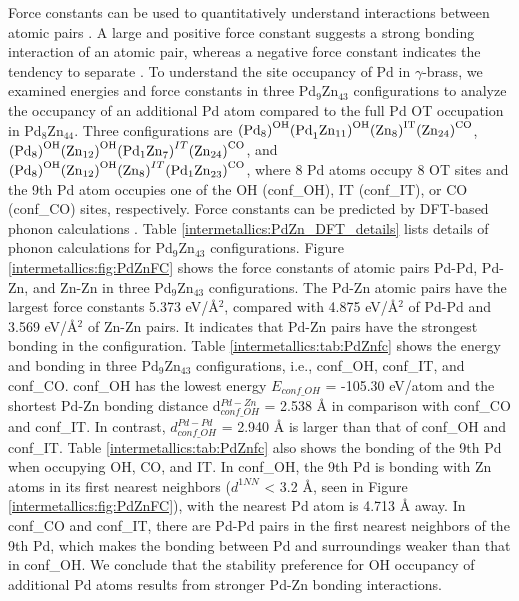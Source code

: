 Force constants can be used to quantitatively understand interactions between atomic pairs \cite{shang2009first}. A large and positive force constant suggests a strong bonding interaction of an atomic pair, whereas a negative force constant indicates the tendency to separate \cite{yu2019synthesis}. To understand the site occupancy of Pd in $\gamma$-brass, we examined energies and force constants in three Pd$_9$Zn$_{43}$ configurations to analyze the occupancy of an additional Pd atom compared to the full Pd OT occupation in Pd$_8$Zn$_{44}$. Three configurations are $({{\rm Pd}_8)}^{\rm OH}{{(\rm Pd}_1{\rm Zn}_{11})}^{\rm OH}({{\rm Zn}_8)}^{\rm IT}({{\rm Zn}_{24})}^{\rm CO}$, \\$({{\rm Pd}_8)}^{\rm OH}{({\rm Zn}_{12})}^{\rm OH}({{{\rm Pd}_1\rm Zn}_7)}^{IT}({{\rm Zn}_{24})}^{\rm CO}$, and $({{\rm Pd}_8)}^{\rm OH}{({\rm Zn}_{12})}^{\rm OH}({{\rm Zn}_8)}^{IT}({{{\rm Pd}_1\rm Zn}_{23})}^{\rm CO}$, where 8 Pd atoms occupy 8 OT sites and the 9th Pd atom occupies one of the OH (conf\_OH), IT (conf\_IT), or CO (conf\_CO) sites, respectively. Force constants can be predicted by DFT-based phonon calculations \cite{shang2018understanding}. Table \ref{intermetallics:PdZn_DFT_details} lists details of phonon calculations for Pd$_9$Zn$_{43}$ configurations. Figure \ref{intermetallics:fig:PdZnFC} shows the force constants of atomic pairs Pd-Pd, Pd-Zn, and Zn-Zn in three Pd$_9$Zn$_{43}$ configurations. The Pd-Zn atomic pairs have the largest force constants 5.373 eV/\r{A}$^2$, compared with 4.875 eV/\r{A}$^2$ of Pd-Pd and 3.569 eV/\r{A}$^2$ of Zn-Zn pairs. It indicates that Pd-Zn pairs have the strongest bonding in the configuration. Table \ref{intermetallics:tab:PdZnfc} shows the energy and bonding in three Pd$_9$Zn$_{43}$ configurations, i.e., conf\_OH, conf\_IT, and conf\_CO. conf\_OH has the lowest energy $E_{conf\_OH}$ = -105.30 eV/atom and the shortest Pd-Zn bonding distance d$_{conf\_OH}^{Pd-Zn}$ = 2.538 \r{A} in comparison with conf\_CO and conf\_IT. In contrast, $d_{conf\_OH}^{Pd-Pd}$ = 2.940 \r{A} is larger than that of conf\_OH and conf\_IT. Table \ref{intermetallics:tab:PdZnfc} also shows the bonding of the 9th Pd when occupying OH, CO, and IT. In conf\_OH, the 9th Pd is bonding with Zn atoms in its first nearest neighbors ($d^{1NN}$ < 3.2 \r{A}, seen in Figure \ref{intermetallics:fig:PdZnFC}), with the nearest Pd atom is 4.713 \r{A} away. In conf\_CO and conf\_IT, there are Pd-Pd pairs in the first nearest neighbors of the 9th Pd, which makes the bonding between Pd and surroundings weaker than that in conf\_OH. We conclude that the stability preference for OH occupancy of additional Pd atoms results from stronger Pd-Zn bonding interactions.

